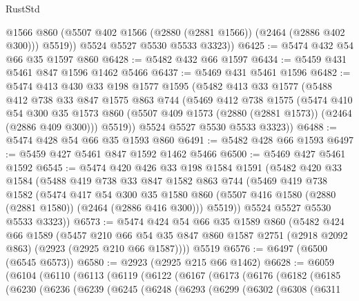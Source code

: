 \begin{lexlean}{RustStd}
\begin{coremodule}
            @1566
            @860
            (@5507 @402 @1566 (@2880 (@2881 @1566)) (@2464 (@2886 @402 @300)))
            @5519))
        @5524
        @5527
        @5530
        @5533
        @3323))
@6425 := @5474 @432 @54 @66 @35 @1597 @860
@6428 := @5482 @432 @66 @1597
@6434 := @5459 @431 @5461 @847 @1596 @1462 @5466
@6437 := @5469 @431 @5461 @1596
@6482 := @5474
    @413
    @430
    @33
    @198
    @1577
    @1595
    (@5482
      @413
      @33
      @1577
      (@5488
        @412
        @738
        @33
        @847
        @1575
        @863
        @744
        (@5469
          @412
          @738
          @1575
          (@5474
            @410
            @54
            @300
            @35
            @1573
            @860
            (@5507 @409 @1573 (@2880 (@2881 @1573)) (@2464 (@2886 @409 @300)))
            @5519))
        @5524
        @5527
        @5530
        @5533
        @3323))
@6488 := @5474 @428 @54 @66 @35 @1593 @860
@6491 := @5482 @428 @66 @1593
@6497 := @5459 @427 @5461 @847 @1592 @1462 @5466
@6500 := @5469 @427 @5461 @1592
@6545 := @5474
    @420
    @426
    @33
    @198
    @1584
    @1591
    (@5482
      @420
      @33
      @1584
      (@5488
        @419
        @738
        @33
        @847
        @1582
        @863
        @744
        (@5469
          @419
          @738
          @1582
          (@5474
            @417
            @54
            @300
            @35
            @1580
            @860
            (@5507 @416 @1580 (@2880 (@2881 @1580)) (@2464 (@2886 @416 @300)))
            @5519))
        @5524
        @5527
        @5530
        @5533
        @3323))
@6573 := @5474
    @424
    @54
    @66
    @35
    @1589
    @860
    (@5482
      @424
      @66
      @1589
      (@5457
        @210
        @66
        @54
        @35
        @847
        @860
        @1587
        @2751
        (@2918 @2092 @863)
        (@2923 (@2925 @210 @66 @1587))))
    @5519
@6576 := @6497 (@6500 (@6545 @6573))
@6580 := @2923 (@2925 @215 @66 @1462)
@6628 := @6059
    (@6104
      (@6110
        (@6113
          (@6119
            (@6122
              (@6167
                (@6173
                  (@6176
                    (@6182
                      (@6185
                        (@6230
                          (@6236
                            (@6239
                              (@6245
                                (@6248
                                  (@6293
                                    (@6299
                                      (@6302
                                        (@6308
                                          (@6311

\end{coremodule}
\end{lexlean}
